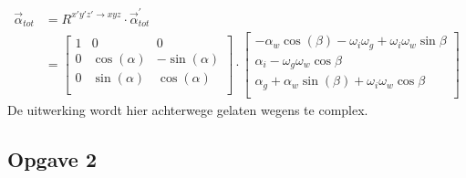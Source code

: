 \begin{equation}
\begin{split}
\vec{\alpha}_{tot}&=R^{x'y'z' \rightarrow xyz} \cdot \vec{\alpha}_{tot}^{'}\\
&=\begin{bmatrix}
1			&			0			&			0		   \\
0			&\cos(\alpha)&-\sin(\alpha)\\
0			&\sin(\alpha)&\cos(\alpha) \\
\end{bmatrix}
\cdot
\begin{bmatrix}
-\alpha_{w}\cos(\beta)-\omega_{i}\omega_{g}+\omega_{i}\omega_{w}\sin{\beta}\\
\alpha_{i}-\omega_{g}\omega_{w}\cos{\beta}\\
\alpha_{g}+	\alpha_{w} \sin(\beta)+\omega_{i}\omega_{w}\cos{\beta}\\
\end{bmatrix}
\end{split}
\label{eq:kin1.9}
\end{equation}
De uitwerking wordt hier achterwege gelaten wegens te complex.
\newpage
\subsection{Opgave 2}

